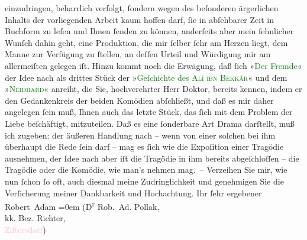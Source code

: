                     einzudringen, beharrlich verfolgt, ſondern wegen des beſonderen ärgerlichen
                    Inhalts der vorliegenden Arbeit kaum hoffen darf, ſie in abſehbarer Zeit in
                    Buchform zu leſen und Ihnen ſenden zu können, anderſeits aber mein ſehnlicher
                    Wunſch dahin geht, eine Produktion, die mir ſelber ſehr am Herzen liegt, dem
                    Manne zur Verfügung zu ſtellen, an deſſen Urteil und Würdigung mir am
                    allermeiſten gelegen iſt.\pend
           \pstart
           Hinzu kommt noch die Erwägung, daß ſich »\textcolor{green}{Der
                        Fremde}{}\ledrightnote{\textcolor{green}{Der Fremde}}« der Idee nach als drittes Stück der »\textcolor{green}{Geſchichte des \textsc{Alî ibn Bekkâr}}{}\ledrightnote{\textcolor{green}{Die Geschichte des Alî ibn Bekkâr mit Schams an-Nahâr}}« und dem »\textcolor{green}{\textsc{Neidhard}}{}\ledrightnote{\textcolor{green}{Neidhard}}« anreiht, die Sie, hochverehrter Herr Doktor, bereits kennen, indem er den
                    Gedankenkreis der beiden Komödien abſchließt, und daß es mir daher angelegen
                    ſein muß, Ihnen auch das letzte Stück, das ſich mit {\pb}dem Problem der Liebe beſchäftigt, mitzuteilen.
                    Daß es eine ſonderbare Art Drama darſtellt, muß ich zugeben: der äußeren
                    Handlung nach – wenn von einer solchen bei ihm überhaupt die Rede ſein darf –
                    mag es ſich wie die Expoſition einer Tragödie ausnehmen, der Idee nach aber iſt
                    die Tragödie in ihm bereits abgeſchloſſen – die Tragödie oder die Komödie, wie
                    man’s nehmen mag. –\pend
           \pstart
           Verzeihen Sie mir, wie nun ſchon ſo oft, auch diesmal meine Zudringlichkeit und
                    genehmigen Sie die Verſicherung meiner Dankbarkeit und Hochachtung.\pend
           \pstart
           Ihr ſehr ergebener{\\[\baselineskip]}\spacefill\mbox{Robert Adam}\pend
           \leftskip=0em{}\pstart
           \noindent{}\raggedleft{}(D\textsuperscript{r} Rob. Ad. Pollak,{\\}kk. Bez. Richter,{\\}\textcolor{pink}{Ziſtersdorf}{}\ledrightnote{\textcolor{pink}{Zistersdorf}})\pend
           \endnumbering{}  
      